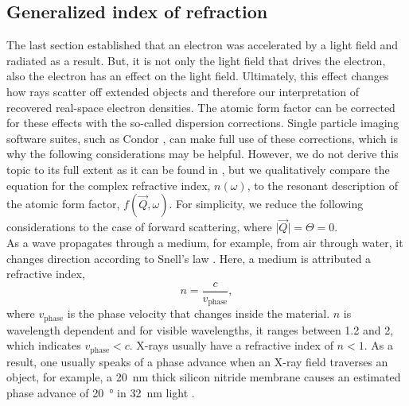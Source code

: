 \subsection{Generalized index of refraction}\label{sec:generalized-index-of-refraction}
The last section established that an electron was accelerated by a light field and radiated as a result.
But, it is not only the light field that drives the electron, also the electron has an effect on the light field. Ultimately, this effect changes how rays scatter off extended objects and therefore our interpretation of recovered real-space electron densities. The atomic form factor can be corrected for these effects with the so-called dispersion corrections. Single particle imaging software suites, such as Condor \cite{Hantke-2016-JCR}, can make full use of these corrections, which is why the following considerations may be helpful. However, we do not derive this topic to its full extent as it can be found in \citep[][p. 55 ff]{Attwood-2007-CUP}, but we qualitatively compare the equation for the complex refractive index, $n\left(\omega\right)$, to the resonant description of the atomic form factor, $f\left(\vec{Q},\omega\right)$. For simplicity, we reduce the following considerations to the case of forward scattering, where $\lvert\vec{Q}\rvert=\Theta=0$.\\[1\baselineskip]
%
As a wave propagates through a medium, for example, from air through water, it changes direction according to Snell's law \citep{Als-Nielson-2011-JWS}. Here, a medium is attributed a refractive index,
\begin{equation}
n=\frac{c}{v_{\text{phase}}},
\label{eq:refractive-index}
\end{equation}
where $v_{\text{phase}}$ is the phase velocity that changes inside the material. $n$ is wavelength dependent and for visible wavelengths, it ranges between 1.2 and 2, which indicates $v_{\text{phase}}<c$. X-rays usually have a refractive index of $n<1$. As a result, one usually speaks of a phase advance when an X-ray field traverses an object, for example, a \SI{20}{\nano\meter} thick silicon nitride membrane causes an estimated phase advance of \SI{20}{\degree} in \SI{32}{\nano\meter} light \cite{Chapman-2006-NatPhys}.
